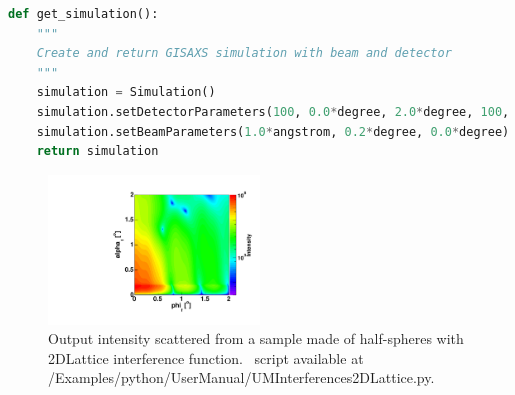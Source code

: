 \begin{lstlisting}[language=python, style=eclipseboxed,numbers=none,nolol]
def get_simulation():
    """
    Create and return GISAXS simulation with beam and detector
    """
    simulation = Simulation()
    simulation.setDetectorParameters(100, 0.0*degree, 2.0*degree, 100, 0.0*degree, 2.0*degree)
    simulation.setBeamParameters(1.0*angstrom, 0.2*degree, 0.0*degree)
    return simulation
\end{lstlisting}


\begin{figure}[ht]
\begin{center}
\includegraphics[width=0.5\textwidth]{Figures/HSphere_2Dlattice}
\end{center}
\caption{Output intensity scattered from a sample made of half-spheres with 2DLattice interference function. \Python\ script available at {/Examples/python/UserManual/UMInterferences2DLattice.py}.}
\label{fig:2dlatticeintensity}
\end{figure}

\FloatBarrier

\newpage{\cleardoublepage}
